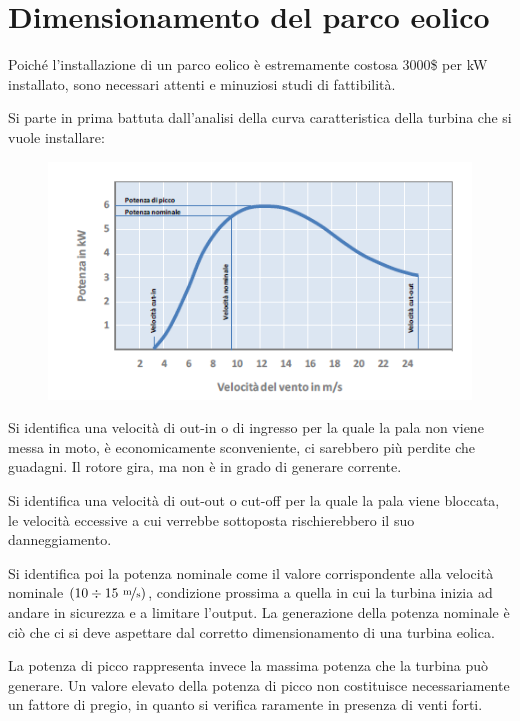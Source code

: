 \documentclass[a4paper, 15pt]{article}
\begin{document}
\section{Dimensionamento del parco eolico}
\begin{adjustwidth}{2in}{}
	Poiché l'installazione di un parco eolico è estremamente costosa 3000\$ per kW installato, sono necessari attenti e minuziosi studi di fattibilità. \newline 
	
	Si parte in prima battuta dall'analisi della curva caratteristica della turbina che si vuole installare:
	\begin{figure}[H]
		\centering
		\includegraphics[width=0.5\linewidth]{immagini/eoliche9}
		\label{fig:eoliche9}
	\end{figure}
	Si identifica una velocità di out-in o di ingresso per la quale la pala non viene messa in moto, è economicamente sconveniente, ci sarebbero più perdite che guadagni. Il rotore gira, ma non è in
	grado di generare corrente.
	
	Si identifica una velocità di out-out o cut-off per la quale la pala viene bloccata, le velocità eccessive a cui verrebbe sottoposta rischierebbero il suo danneggiamento. 
	
	Si identifica poi la potenza nominale come il valore corrispondente alla velocità nominale $(10\div15~\nicefrac{\text{m}}{\text{s}})$, condizione prossima a quella in cui la turbina inizia ad andare in sicurezza e a
	limitare l’output. La generazione della potenza nominale è ciò che ci si deve aspettare dal corretto dimensionamento di una turbina eolica.
	
	La potenza di picco rappresenta invece la massima
	potenza che la turbina può generare. Un valore
	elevato della potenza di picco non costituisce
	necessariamente un fattore di pregio, in quanto
	si verifica raramente in presenza di venti forti. \newline 
	

\end{adjustwidth}
\end{document}
